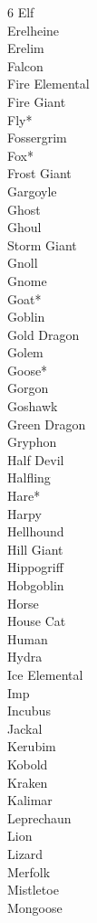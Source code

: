 \begin{multicols}{6}
Elf \\
Erelheine \\
Erelim \\
Falcon \\
Fire Elemental \\
Fire Giant \\
Fly* \\
Fossergrim \\
Fox* \\
Frost Giant \\
Gargoyle \\
Ghost \\
Ghoul \\
Storm Giant \\
Gnoll \\
Gnome \\
Goat* \\
Goblin \\
Gold Dragon \\
Golem \\
Goose* \\
Gorgon \\
Goshawk \\
Green Dragon \\
Gryphon \\
Half Devil \\
Halfling \\
Hare* \\
Harpy \\
Hellhound \\
Hill Giant \\
Hippogriff \\
Hobgoblin \\
Horse \\
House Cat \\
Human \\
Hydra \\
Ice Elemental \\
Imp \\
Incubus \\
Jackal \\
Kerubim \\
Kobold \\
Kraken \\
Kalimar \\
Leprechaun \\
Lion \\
Lizard \\
Merfolk \\
Mistletoe \\
Mongoose \\

\end{multicols}
